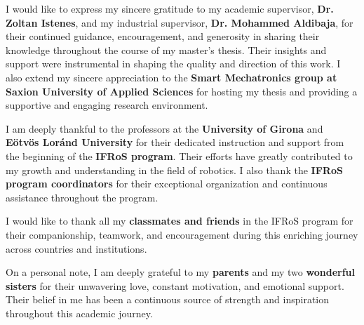 
I would like to express my sincere gratitude to my academic supervisor, \textbf{Dr. Zoltan Istenes}, and my industrial supervisor, \textbf{Dr. Mohammed Aldibaja}, for their continued guidance, encouragement, and generosity in sharing their knowledge throughout the course of my master’s thesis. Their insights and support were instrumental in shaping the quality and direction of this work. I also extend my sincere appreciation to the \textbf{Smart Mechatronics group at Saxion University of Applied Sciences} for hosting my thesis and providing a supportive and engaging research environment.

I am deeply thankful to the professors at the \textbf{University of Girona} and \textbf{Eötvös Loránd University} for their dedicated instruction and support from the beginning of the \textbf{IFRoS program}. Their efforts have greatly contributed to my growth and understanding in the field of robotics. I also thank the \textbf{IFRoS program coordinators} for their exceptional organization and continuous assistance throughout the program.

I would like to thank all my \textbf{classmates and friends} in the IFRoS program for their companionship, teamwork, and encouragement during this enriching journey across countries and institutions.

On a personal note, I am deeply grateful to my \textbf{parents} and my two \textbf{wonderful sisters} for their unwavering love, constant motivation, and emotional support. Their belief in me has been a continuous source of strength and inspiration throughout this academic journey.

